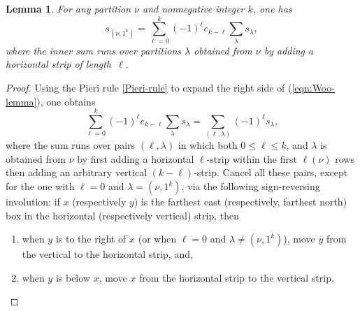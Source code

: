 \documentclass[12pt,dvips]{amsart}
\theoremstyle{plain}
\newtheorem{lemma}[theorem]{Lemma}
\theoremstyle{definition}
\theoremstyle{remark}
\numberwithin{equation}{section}
\begin{document}
\begin{lemma}
\label{Woo-lemma}
For any partition $\nu$ and nonnegative integer $k$, one has
\begin{equation}
\label{eqn:Woo-lemma}
s_{(\nu,1^k)} = \sum_{\ell=0}^k (-1)^{\ell} e_{k-\ell} \sum_\lambda s_\lambda,
\end{equation}
where the inner sum runs over partitions $\lambda$ 
obtained from $\nu$ by adding a horizontal strip of length~$\ell$.
\end{lemma}
\begin{proof}
Using the Pieri rule \eqref{Pieri-rule} to expand the right side 
of (\ref{eqn:Woo-lemma}), one obtains
$$
\sum_{\ell=0}^k (-1)^{\ell} e_{k-\ell} \sum_\lambda s_\lambda=
\sum_{(\ell,\lambda)}(-1)^\ell s_\lambda,
$$
where the sum runs over pairs $(\ell,\lambda)$ in which both $0 \leq
\ell \leq k$, and $\lambda$ is obtained from $\nu$ by first adding a
horizontal $\ell$-strip within the first $\ell(\nu)$ rows then adding
an arbitrary vertical $(k-\ell)$-strip.  Cancel all these pairs,
except for the one with $\ell=0$ and $\lambda=(\nu,1^k)$, via the
following sign-reversing involution: if $x$ (respectively $y$) is the
farthest east (respectively, farthest north) box in the horizontal
(respectively vertical) strip, then
\begin{enumerate}
\item[$\bullet$] when $y$ is to the right of $x$ (or when $\ell=0$ and
$\lambda \neq (\nu,1^k)$), move $y$ from the vertical to the
horizontal strip, and,
\item[$\bullet$] when $y$ is below $x$, move $x$ from the horizontal strip
to the vertical strip.
\end{enumerate}
\end{proof}


%
%
%
%
\end{document}
